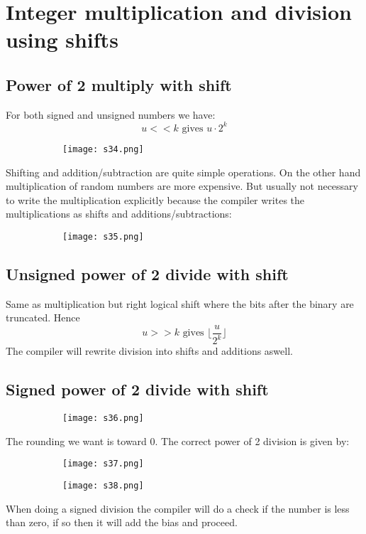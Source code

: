 \documentclass[8pt]{extreport}
\begin{document}
\section{Integer multiplication and division using shifts}

\subsection{ Power of 2 multiply with shift}
For both signed and unsigned numbers we have:
$$ u << k \text{ gives } u\cdot 2^k$$
 \begin{figure}[H]
\centering
\begin{subfigure}[b]{0.4\linewidth}
\texttt{[image: s34.png]}
\end{subfigure}
\end{figure}
Shifting and addition/subtraction are quite simple operations. On the other hand multiplication of random numbers are more expensive. But usually not necessary to write the multiplication explicitly because the compiler writes the multiplications as shifts and additions/subtractions:
 \begin{figure}[H]
\centering
\begin{subfigure}[b]{0.4\linewidth}
\texttt{[image: s35.png]}
\end{subfigure}
\end{figure}

\subsection{Unsigned power of 2 divide with shift}
Same as multiplication but right logical shift where the bits after the binary are truncated. Hence 
$$ u >> k \text{ gives } \lfloor \frac{u}{2^k} \rfloor$$
The compiler will rewrite division into shifts and additions aswell.

\subsection{Signed power of 2 divide with shift } 
 \begin{figure}[H]
\centering
\begin{subfigure}[b]{0.4\linewidth}
\texttt{[image: s36.png]}
\end{subfigure}
\end{figure}
The rounding we want is toward 0. The correct power of 2 division is given by:
 \begin{figure}[H]
\centering
\begin{subfigure}[b]{0.4\linewidth}
\texttt{[image: s37.png]}
\end{subfigure}
\begin{subfigure}[b]{0.4\linewidth}
\texttt{[image: s38.png]}
\end{subfigure}
\end{figure}
When doing a signed division the compiler will do a check if the number is less than zero, if so then it will add the bias and proceed.
\end{document}
